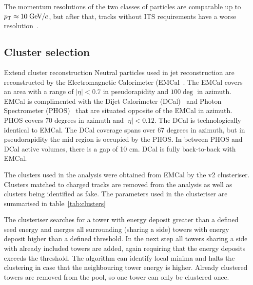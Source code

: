 The momentum resolutions of the two classes of particles are comparable up to $p_{\rm T} \approx 10\;\mathrm{GeV}\kern-0.05em/\kern-0.02em c$, but after that, tracks without ITS requirements have a worse resolution~\cite{alicePerformance,aliceBackgroundFluctuation}.







\subsection{Cluster selection}
{\color{red} Extend cluster reconstruction}
Neutral particles used in jet reconstruction are reconstructed by the Electromagnetic Calorimeter (EMCal~\cite{Cortese:2008zza}. The EMCal covers an area with a range of $|\eta| < 0.7$  in pseudorapidity and $ 100 \deg $ in azimuth. EMCal is complimented with the Dijet Calorimeter (DCal)~\cite{DCAL} and Photon Spectrometer (PHOS)~\cite{PHOS} that are situated opposite of the EMCal in azimuth. PHOS covers 70 degrees in azimuth and $\left| \eta \right| < 0.12$. The DCal is technologically identical to EMCal. The DCal coverage spans over 67 degrees in azimuth, but in pseudorapidity the mid region is occupied by the PHOS. In between PHOS and DCal active volumes, there is a gap of 10 cm. DCal is fully back-to-back with EMCal.


The clusters used in the analysis were obtained from EMCal by the v2 clusteriser. Clusters matched to charged tracks are removed from the analysis as well as clusters being identified as fake. The parameters used in the clusteriser are summarised in table~\ref{tab:clusters}


The clusteriser  searches for a tower with energy deposit greater than a defined seed energy and merges all surrounding (sharing a side) towers with energy deposit higher than a defined threshold. In the next step all towers sharing a side with already included towers are added, again requiring that the energy deposits exceeds the threshold. The algorithm can identify local minima and halts the clustering in case that the neighbouring tower energy is higher. Already clustered towers are removed from the pool, so one tower can only be clustered once.

